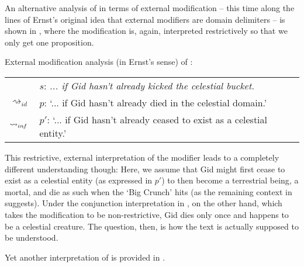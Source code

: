 \documentclass[output=paper]{langsci/langscibook}
\begin{document}
An alternative analysis of  in terms of external modification -- this time along the lines of Ernst's original idea that external modifiers are domain delimiters -- is shown in , where the modification is, again, interpreted restrictively so that we only get one proposition.

\ea \label{analysis2 celestial bucket} External modification analysis (in Ernst's sense) of : \\
\vspace{5pt}
\begin{tabular}{ll}
								& 	$s$: \hspace{4pt} \textit{... if Gid hasn't already kicked the celestial bucket.} \\
$\rightsquigarrow_{id}$				&	$p$: \hspace{1pt} `... if Gid hasn't already died in the celestial domain.' \\
$\rightsquigarrow_{in\hspace{-0.8pt} f}$	&	$p'$: \hspace{-1.5pt} `... if Gid hasn't already ceased to exist as a celestial entity.' \\
\end{tabular}
\z

\noindent This restrictive, external interpretation of the modifier leads to a completely different understanding though: Here, we assume that Gid might first cease to exist as a celestial entity (as expressed in $p'$) to then become a terrestrial being, a mortal, and die as such when the `Big Crunch' hits (as the remaining context in  suggests). Under the conjunction interpretation in , on the other hand, which takes the modification to be non-restrictive, Gid dies only once and happens to be a celestial creature. The question, then, is how the text is actually supposed to be understood. 

Yet another interpretation of  is provided in .
\end{document}
